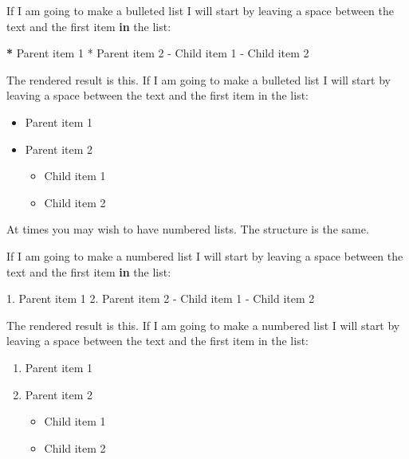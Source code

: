 \documentclass[
]{book}
\newenvironment{Shaded}{\begin{snugshade}}{\end{snugshade}}
\newcommand{\ControlFlowTok}[1]{\textcolor[rgb]{0.13,0.29,0.53}{\textbf{#1}}}
\newcommand{\DecValTok}[1]{\textcolor[rgb]{0.00,0.00,0.81}{#1}}
\newcommand{\ErrorTok}[1]{\textcolor[rgb]{0.64,0.00,0.00}{\textbf{#1}}}
\newcommand{\FloatTok}[1]{\textcolor[rgb]{0.00,0.00,0.81}{#1}}
\newcommand{\NormalTok}[1]{#1}
\newcommand{\SpecialCharTok}[1]{\textcolor[rgb]{0.00,0.00,0.00}{#1}}
\providecommand{\tightlist}{%
  \setlength{\itemsep}{0pt}\setlength{\parskip}{0pt}}
\begin{document}
\begin{Shaded}
\begin{Highlighting}[]
\NormalTok{If I am going to make a bulleted list I will start by leaving a space between the text and the first item }\ControlFlowTok{in}\NormalTok{ the list}\SpecialCharTok{:}

\ErrorTok{*}\NormalTok{ Parent item }\DecValTok{1}
\SpecialCharTok{*}\NormalTok{ Parent item }\DecValTok{2}
  \SpecialCharTok{{-}}\NormalTok{ Child item }\DecValTok{1}
  \SpecialCharTok{{-}}\NormalTok{ Child item }\DecValTok{2}
\end{Highlighting}
\end{Shaded}

The rendered result is this. If I am going to make a bulleted list I will start by leaving a space between the text and the first item in the list:

\begin{itemize}
\tightlist
\item
  Parent item 1
\item
  Parent item 2

  \begin{itemize}
  \tightlist
  \item
    Child item 1
  \item
    Child item 2
  \end{itemize}
\end{itemize}

At times you may wish to have numbered lists. The structure is the same.

\begin{Shaded}
\begin{Highlighting}[]
\NormalTok{If I am going to make a numbered list I will start by leaving a space between the text and the first item }\ControlFlowTok{in}\NormalTok{ the list}\SpecialCharTok{:}
  
\FloatTok{1.}\NormalTok{ Parent item }\DecValTok{1}
\FloatTok{2.}\NormalTok{ Parent item }\DecValTok{2}
   \SpecialCharTok{{-}}\NormalTok{ Child item }\DecValTok{1}
   \SpecialCharTok{{-}}\NormalTok{ Child item }\DecValTok{2}
\end{Highlighting}
\end{Shaded}

The rendered result is this. If I am going to make a numbered list I will start by leaving a space between the text and the first item in the list:

\begin{enumerate}
\def\labelenumi{\arabic{enumi}.}
\tightlist
\item
  Parent item 1
\item
  Parent item 2

  \begin{itemize}
  \tightlist
  \item
    Child item 1
  \item
    Child item 2
  \end{itemize}
\end{enumerate}
\end{document}
